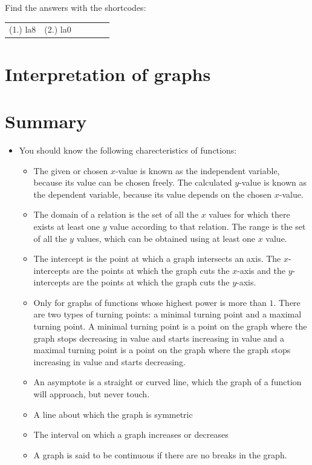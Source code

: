 \begin{enumerate}[noitemsep, label=\textbf{\arabic*}. ]
\par {} Find the answers with the shortcodes:
\par \begin{tabular}[h]{cccccc}
(1.) la8  &  (2.) la0  & \end{tabular}
\section{Interpretation of graphs}
\section{Summary}
\nopagebreak
\begin{itemize}[noitemsep]
\item You should know the following charecteristics of functions: 
\begin{itemize}[noitemsep]
\item The given or chosen $x$-value is known as the independent variable, because its value can be chosen freely. The calculated $y$-value is known as the dependent variable, because its value depends on the chosen $x$-value.
\item The domain of a relation is the set of all the $x$ values for which there exists at least one $y$ value according to that relation. The range is the set of all the $y$ values, which can be obtained using at least one $x$ value.
\item The intercept is the point at which a graph intersects an axis. The $x$-intercepts are the points at which the graph cuts the $x$-axis and the $y$-intercepts are the points at which the graph cuts the $y$-axis. 
\item Only for graphs of functions whose highest power is more than $1$. There are two types of turning points: a minimal turning point and a maximal turning point. A minimal turning point is a point on the graph where the graph stops decreasing in value and starts increasing in value and a maximal turning point is a point on the graph where the graph stops increasing in value and starts decreasing. 
\item An asymptote is a straight or curved line, which the graph of a function will approach, but never touch.
\item A line about which the graph is symmetric
\item  The interval on which a graph increases or decreases\item A graph is said to be continuous if there are no breaks in the graph. 

\end{itemize}
\end{itemize}
\end{enumerate}
